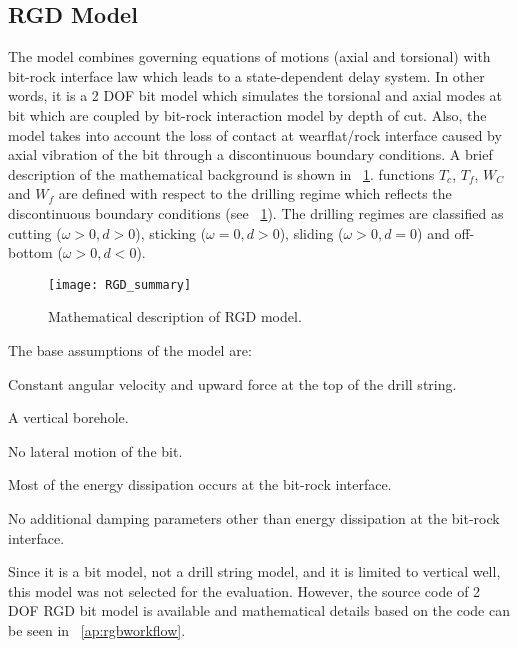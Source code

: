 \subsection{RGD Model}
The model combines governing equations of motions (axial and torsional) with bit-rock interface law which leads to a state-dependent delay system. In other words, it is a 2 DOF bit model which simulates the torsional and axial modes at bit which are coupled by bit-rock interaction model by depth of cut. Also, the model takes into account the loss of contact at wearflat/rock interface caused by axial vibration of the bit through a discontinuous boundary conditions. A brief description of the mathematical background is shown in \figurename~\ref{figure_RGD_Summary}.  functions $T_c$, $T_f$, $W_C$ and $W_f$ \resolvedcomment{} are defined with respect to the drilling regime which reflects the discontinuous boundary conditions (see \figurename~\ref{figure_RGD_Summary}). \needsclarification{} The drilling regimes are classified as cutting ($\omega>0, d>0$), sticking ($\omega=0, d>0$), sliding ($\omega>0, d=0$) and off-bottom ($\omega>0, d<0$). \resolvedcomment{} 
\begin{figure}
  \centering
  \texttt{[image: RGD\_summary]}
  \caption[Mathematical description of RGD model]{Mathematical description of RGD model.}\label{figure_RGD_Summary}
\end{figure}
The base assumptions of the model are:
\begin{bulletedlist}
	\item Constant angular velocity and upward force at the top of the drill string.
	\item A vertical borehole.
	\item No lateral motion of the bit.
	\item Most of the energy dissipation occurs at the bit-rock interface.
    \item No additional damping parameters other than energy dissipation at the bit-rock interface.
\end{bulletedlist}
Since it is a bit model, not a drill string model, and it is limited to vertical well, this model was not selected for the evaluation. However, the source code of 2 DOF RGD bit model is available and mathematical details based on the code can be seen in \appendixname~\ref{ap:rgbworkflow}.  \resolvedcomment{}

